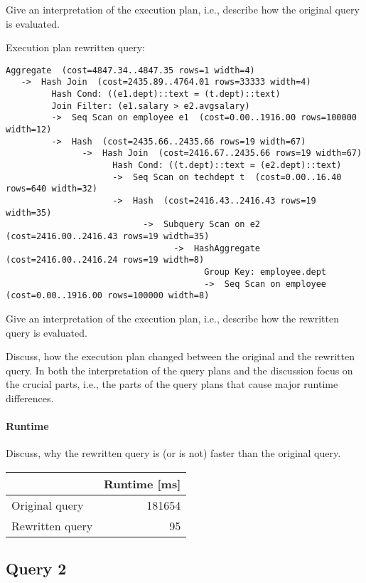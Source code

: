\documentclass[11pt]{scrartcl}
\begin{document}
Give an interpretation of the execution plan, i.e., describe how the
original query is evaluated.

Execution plan rewritten query:

\begin{verbatim}
Aggregate  (cost=4847.34..4847.35 rows=1 width=4)
   ->  Hash Join  (cost=2435.89..4764.01 rows=33333 width=4)
         Hash Cond: ((e1.dept)::text = (t.dept)::text)
         Join Filter: (e1.salary > e2.avgsalary)
         ->  Seq Scan on employee e1  (cost=0.00..1916.00 rows=100000 width=12)
         ->  Hash  (cost=2435.66..2435.66 rows=19 width=67)
               ->  Hash Join  (cost=2416.67..2435.66 rows=19 width=67)
                     Hash Cond: ((t.dept)::text = (e2.dept)::text)
                     ->  Seq Scan on techdept t  (cost=0.00..16.40 rows=640 width=32)
                     ->  Hash  (cost=2416.43..2416.43 rows=19 width=35)
                           ->  Subquery Scan on e2  (cost=2416.00..2416.43 rows=19 width=35)
                                 ->  HashAggregate  (cost=2416.00..2416.24 rows=19 width=8)
                                       Group Key: employee.dept
                                       ->  Seq Scan on employee  (cost=0.00..1916.00 rows=100000 width=8)
\end{verbatim}

Give an interpretation of the execution plan, i.e., describe how the
rewritten query is evaluated.

Discuss, how the execution plan changed between the original and the
rewritten query. In both the interpretation of the query plans and the
discussion focus on the crucial parts, i.e., the parts of the query
plans that cause major runtime differences.

\paragraph{Runtime} Discuss, why the rewritten query is (or is not)
faster than the original query.


\begin{table}[H]
  \begin{tabular}{l|r}
    & Runtime [ms] \\
   \hline
    Original query & 181654 \\
    Rewritten query & 95 \\
  \end{tabular}
\end{table}

\subsection*{Query 2}
\end{document}

